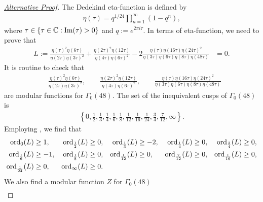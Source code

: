 \documentclass[12pt]{article}
\numberwithin{equation}{section}
\theoremstyle{plain}
\numberwithin{theorem}{section}
\theoremstyle{definition}
\theoremstyle{remark}
\begin{document}
\iffalse
\begin{proof}[\underline{Alternative Proof}]
The Dedekind eta-function is defined by
\begin{align*}
    \eta({\tau})=q^{1/24}\prod_{n=1}^\infty (1-q^n),
\end{align*}
where $\tau\in\{\tau\in\mathbb{C}: \textup{Im}(\tau)>0\}$ and $q:=e^{2\pi i \tau}$. In terms of eta-function, we need to prove that 
\begin{align*}
    L:=\frac{\eta(\tau)^2 \eta(6\tau)}{\eta(2\tau) \eta(3\tau)^2}+\frac{\eta(2\tau)^2 \eta(12\tau)}{\eta(4\tau) \eta(6\tau)^2}-2 \frac{\eta(\tau) \eta(16\tau) \eta(24\tau)^2}{\eta(3\tau) \eta(6\tau) \eta(8\tau) \eta(48\tau)}&=0.
\end{align*}
    It is routine to check that
    \begin{align*}
        &\frac{\eta \! \left(\tau \right)^{2} \eta \! \left(6 \tau \right)}{\eta \! \left(2 \tau \right) \eta \! \left(3 \tau \right)^{2}},\quad \quad \frac{\eta \! \left(2 \tau \right)^{2} \eta \! \left(12 \tau \right)}{\eta \! \left(4 \tau \right) \eta \! \left(6 \tau \right)^{2}},\quad\quad \frac{\eta \! \left(\tau \right) \eta \! \left(16 \tau \right) \eta \! \left(24 \tau \right)^{2}}{\eta \! \left(3 \tau \right) \eta \! \left(6 \tau \right) \eta \! \left(8 \tau \right) \eta \! \left(48 \tau \right)}
    \end{align*} are  modular functions for $\Gamma_0(48)$. The set of the inequivalent cusps of $\Gamma_0(48)$ is
    \begin{align*}
        \left\{0,\frac{1}{2},\frac{1}{3},\frac{1}{4},\frac{1}{6},\frac{1}{8},\frac{1}{12},\frac{1}{16},\frac{1}{24},\frac{3}{4},\frac{7}{12},\infty \right\}.
    \end{align*}
    Employing \cite[Theorem 1.65]{Ono04}, we find that
    \begin{align*}
        \textup{ord}_0(L)&\ge 1, & \textup{ord}_\frac{1}{2}(L)&\ge 0, & \textup{ord}_\frac{1}{3}(L)&\ge -2, & \textup{ord}_\frac{1}{4}(L)&\ge 0, & \textup{ord}_\frac{3}{4}(L)&\ge 0, \\ \textup{ord}_\frac{1}{6}(L)&\ge -1, &
        \textup{ord}_\frac{1}{8}(L)&\ge 0, & \textup{ord}_\frac{1}{12}(L)&\ge 0, & \textup{ord}_\frac{7}{12}(L)&\ge 0, & \textup{ord}_\frac{1}{16}(L)&\ge 0, \\ \textup{ord}_\frac{1}{24}(L)&\ge 0, & \textup{ord}_\infty(L)&\ge 0.
    \end{align*}
    We also find a modular function $Z$ for $\Gamma_0(48)$
    \begin{align*}

\end{align*}
\end{proof}
\end{document}
